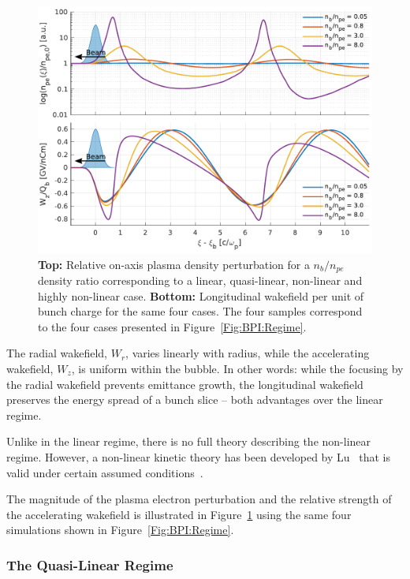 \begin{figure}[hbt]
    \centering
    \includegraphics[width=0.875\linewidth,trim={0mm 0mm 0mm 0mm},clip]{figures/Density}
    \caption{\label{Fig:BPI:Density}
        \textbf{Top:} Relative on-axis plasma density perturbation for a $n_{b}/n_{pe}$ density ratio corresponding to a linear, quasi-linear, non-linear and highly non-linear case.
        \textbf{Bottom:} Longitudinal wakefield per unit of bunch charge for the same four cases.
        The four samples correspond to the four cases presented in Figure~\ref{Fig:BPI:Regime}.
    }
\end{figure}

The radial wakefield, $W_{r}$, varies linearly with radius, while the accelerating wakefield, $W_{z}$, is uniform within the bubble.
In other words: while the focusing by the radial wakefield prevents emittance growth, the longitudinal wakefield preserves the energy spread of a bunch slice -- both advantages over the linear regime.

Unlike in the linear regime, there is no full theory describing the non-linear regime.
However, a non-linear kinetic theory has been developed by Lu \etal ~that is valid under certain assumed conditions~\cite{lu:2006a,lu:2006}.

The magnitude of the plasma electron perturbation and the relative strength of the accelerating wakefield is illustrated in Figure~\ref{Fig:BPI:Density} using the same four simulations shown in Figure~\ref{Fig:BPI:Regime}.

\subsubsection{The Quasi-Linear Regime}
\label{Int:BPI:QLin}

